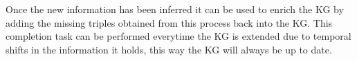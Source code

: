 Once the new information has been inferred it can be used to enrich the KG by adding the missing triples obtained from this process back into the KG. This completion task can be performed everytime the KG is extended due to temporal shifts in the information it holds, this way the KG will always be up to date.






